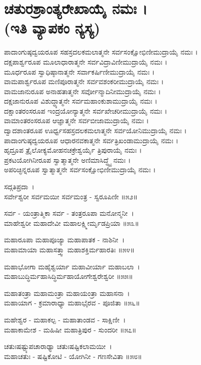 \section{ಚತುರಶ್ರಾಂತ್ಯರೇಖಾಯೈ ನಮಃ ।\\ (ಇತಿ ವ್ಯಾಪಕಂ ನ್ಯಸ್ಯ)}
ಪಾದಾಂಗುಷ್ಠದ್ವಯರೂಪ ಸಹಸ್ರದಲಕಮಲಾತ್ಮನೇ ಸರ್ವಸಂಕ್ಷೋಭಿಣೀಮುದ್ರಾಯೈ ನಮಃ ।\\
ದಕ್ಷಪಾರ್ಶ್ವರೂಪ ಮೂಲಾಧಾರಾತ್ಮನೇ ಸರ್ವವಿದ್ರಾವಿಣೀಮುದ್ರಾಯೈ ನಮಃ ।\\
ಮೂರ್ಧರೂಪ ಸ್ವಾಧಿಷ್ಠಾನಾತ್ಮನೇ ಸರ್ವಾಕರ್ಷಿಣೀಮುದ್ರಾಯೈ ನಮಃ ।\\
ವಾಮಪಾರ್ಶ್ವರೂಪ ಮಣಿಪೂರಾತ್ಮನೇ ಸರ್ವವಶಂಕರೀಮುದ್ರಾಯೈ ನಮಃ ।\\
ವಾಮಜಾನುರೂಪ ಅನಾಹತಾತ್ಮನೇ ಸರ್ವೋನ್ಮಾದಿನೀಮುದ್ರಾಯೈ ನಮಃ ।\\
ದಕ್ಷಜಾನುರೂಪ ವಿಶುದ್ಧ್ಯಾತ್ಮನೇ ಸರ್ವಮಹಾಂಕುಶಾಮುದ್ರಾಯೈ ನಮಃ ।\\
ದಕ್ಷಾಂತರಂಸರೂಪ ಇಂದ್ರಯೋನ್ಯಾತ್ಮನೇ ಸರ್ವಖೇಚರೀಮುದ್ರಾಯೈ ನಮಃ ।\\
ವಾಮಾಂತರಂಸರೂಪ ಆಜ್ಞಾತ್ಮನೇ ಸರ್ವಬೀಜಾಮುದ್ರಾಯೈ ನಮಃ ।\\
ದ್ವಾದಶಾಂತರೂಪ ಊರ್ಧ್ವಸಹಸ್ರದಲಕಮಲಾತ್ಮನೇ ಸರ್ವಯೋನಿಮುದ್ರಾಯೈ ನಮಃ ।\\
ಪಾದಾಂಗುಷ್ಠದ್ವಯರೂಪ ಆಧಾರನವಕಾತ್ಮನೇ ಸರ್ವತ್ರಿಖಂಡಾಮುದ್ರಾಯೈ ನಮಃ ।\\
ಹೃದ್ರೂಪ ತ್ರೈಲೋಕ್ಯಮೋಹನಚಕ್ರೇಶ್ವರ್ಯೈ ತ್ರಿಪುರಾಯೈ ನಮಃ ।\\
ಪ್ರಕಟಯೋಗಿನೀರೂಪ ಸ್ವಾತ್ಮಾತ್ಮನೇ ಅಣಿಮಾಸಿದ್ಧ್ಯೈ ನಮಃ ।\\
ಅಪರಿಚ್ಛಿನ್ನರೂಪ ಸ್ವಾತ್ಮಾತ್ಮನೇ ಸರ್ವಸಂಕ್ಷೋಭಿಣೀಮುದ್ರಾಯೈ ನಮಃ ।

ಸದ್ಗತಿಪ್ರದಾ~।\\
ಸರ್ವೇಶ್ವರೀ ಸರ್ವಮಯೀ ಸರ್ವಮಂತ್ರ - ಸ್ವರೂಪಿಣೀ ॥೫೨॥

ಸರ್ವ - ಯಂತ್ರಾತ್ಮಿಕಾ ಸರ್ವ - ತಂತ್ರರೂಪಾ ಮನೋನ್ಮನೀ~।\\
ಮಾಹೇಶ್ವರೀ ಮಹಾದೇವೀ ಮಹಾಲಕ್ಷ್ಮೀರ್ಮೃಡಪ್ರಿಯಾ ॥೫೩॥

ಮಹಾರೂಪಾ ಮಹಾಪೂಜ್ಯಾ ಮಹಾಪಾತಕ - ನಾಶಿನೀ~।\\
ಮಹಾಮಾಯಾ ಮಹಾಸತ್ತ್ವಾ ಮಹಾಶಕ್ತಿರ್ಮಹಾರತಿಃ ॥೫೪॥

ಮಹಾಭೋಗಾ ಮಹೈಶ್ವರ್ಯಾ ಮಹಾವೀರ್ಯಾ ಮಹಾಬಲಾ~।\\
ಮಹಾಬುದ್ಧಿರ್ಮಹಾಸಿದ್ಧಿರ್ಮಹಾಯೋಗೇಶ್ವರೇಶ್ವರೀ ॥೫೫॥

ಮಹಾತಂತ್ರಾ ಮಹಾಮಂತ್ರಾ ಮಹಾಯಂತ್ರಾ ಮಹಾಸನಾ~।\\
ಮಹಾಯಾಗ - ಕ್ರಮಾರಾಧ್ಯಾ ಮಹಾಭೈರವ - ಪೂಜಿತಾ ॥೫೬॥

ಮಹೇಶ್ವರ - ಮಹಾಕಲ್ಪ - ಮಹಾತಾಂಡವ - ಸಾಕ್ಷಿಣೀ~।\\
ಮಹಾಕಾಮೇಶ - ಮಹಿಷೀ ಮಹಾತ್ರಿಪುರ - ಸುಂದರೀ ॥೫೭॥

ಚತುಃಷಷ್ಟ್ಯುಪಚಾರಾಢ್ಯಾ ಚತುಃಷಷ್ಟಿಕಲಾಮಯೀ~।\\
ಮಹಾಚತುಃ - ಷಷ್ಟಿಕೋಟಿ - ಯೋಗಿನೀ - ಗಣಸೇವಿತಾ ॥೫೮॥

